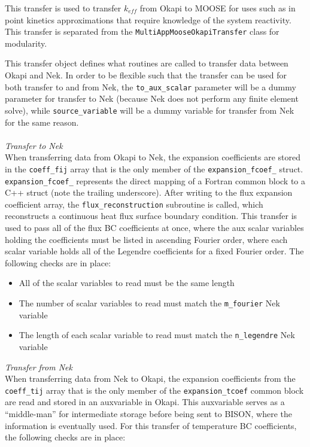 \documentclass[10pt]{article}
\newcounter{subsubsubsection}[subsubsection]
\numberwithin{equation}{section} %
\begin{document}
This transfer is used to transfer \(k_{eff}\) from Okapi to MOOSE for uses such as in point kinetics approximations that require knowledge of the system reactivity. This transfer is separated from the {\tt MultiAppMooseOkapiTransfer} class for modularity.

This transfer object defines what routines are called to transfer data between Okapi and Nek. In order to be flexible such that the transfer can be used for both transfer to and from Nek, the {\tt to\_aux\_scalar} parameter will be a dummy parameter for transfer to Nek (because Nek does not perform any finite element solve), while {\tt source\_variable} will be a dummy variable for transfer from Nek for the same reason.
\\\\
{\it Transfer to Nek}\\
When transferring data from Okapi to Nek, the expansion coefficients are stored in the {\tt coeff\_fij} array that is the only member of the {\tt expansion\_fcoef\_} struct. {\tt expansion\_fcoef\_} represents the direct mapping of a Fortran common block to a C++ struct (note the trailing underscore). After writing to the flux expansion coefficient array, the {\tt flux\_reconstruction} subroutine is called, which reconstructs a continuous heat flux surface boundary condition. This transfer is used to pass all of the flux BC coefficients at once, where the aux scalar variables holding the coefficients must be listed in ascending Fourier order, where each scalar variable holds all of the Legendre coefficients for a fixed Fourier order. The following checks are in place:

\begin{itemize}
\item All of the scalar variables to read must be the same length
\item The number of scalar variables to read must match the {\tt m\_fourier} Nek variable
\item The length of each scalar variable to read must match the {\tt n\_legendre} Nek variable
\end{itemize}

{\it Transfer from Nek}\\
When transferring data from Nek to Okapi, the expansion coefficients from the {\tt coeff\_tij} array that is the only member of the {\tt expansion\_tcoef} common block are read and stored in an auxvariable in Okapi. This auxvariable serves as a ``middle-man'' for intermediate storage before being sent to BISON, where the information is eventually used. For this transfer of temperature BC coefficients, the following checks are in place:
\end{document}
